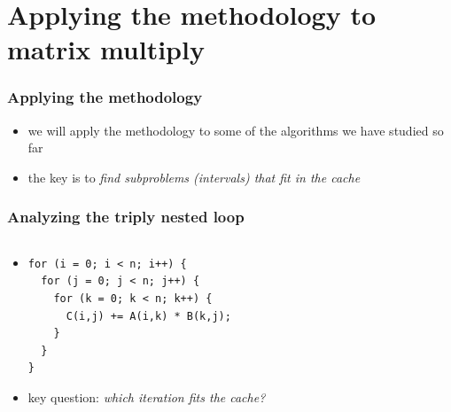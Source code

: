 \documentclass[12pt,dvipdfmx]{beamer}
\newcommand{\ao}[1]{{\color{blue}#1}}
\begin{document}
\section{Applying the methodology to matrix multiply}

\begin{frame}[fragile]
\frametitle{Applying the methodology}
\begin{itemize}

\item we will apply the methodology to some of the 
  algorithms we have studied so far

\item the key is to \ao{\em find subproblems (intervals) that fit in the cache}
\end{itemize}
\end{frame}


\begin{frame}[fragile]
\frametitle{Analyzing the triply nested loop}
\begin{columns}[t]
\begin{column}{0.55\textwidth}
\begin{itemize}
\item []
\begin{lstlisting}
for (i = 0; i < n; i++) {
  for (j = 0; j < n; j++) {
    for (k = 0; k < n; k++) {
      C(i,j) += A(i,k) * B(k,j);
    }
  }
}
\end{lstlisting}
\item key question:
  \ao{\emph{which iteration fits the cache?}}
\end{itemize}
\end{column}

\begin{column}{0.45\textwidth}
\begin{center}
\def\svgwidth{0.9\textwidth}
{\tiny }
\end{center}
\end{column}
\end{columns}
\end{frame}
\end{document}
